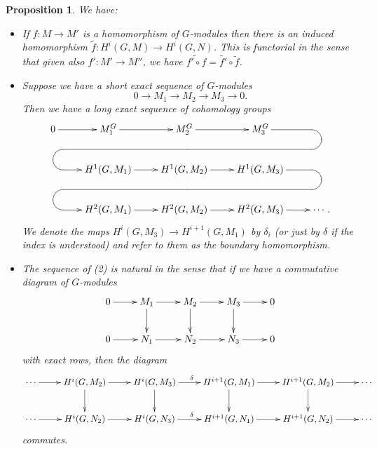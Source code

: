 \documentclass[11pt]{amsart}
\numberwithin{equation}{section}
\newtheorem{proposition}[equation]{Proposition}
\theoremstyle{remark}
\theoremstyle{remark}
\theoremstyle{remark}
\theoremstyle{definition}
\theoremstyle{definition}
\theoremstyle{definition}
\theoremstyle{definition}
\theoremstyle{definition}
\theoremstyle{definition}
\begin{document}
\begin{proposition} \label{long exac cohomo grps}
We have:
\begin{itemize}
\item[(1)]
If $f:M\rightarrow M'$ is a homomorphism of $G$-modules then there is an induced homomorphism $\tilde{f}:H^i(G,M)\rightarrow H^i(G,N)$. This is functorial in the sense that given also $f':M'\rightarrow M''$, we have $\widetilde{f'\circ f}=\widetilde{f'}\circ \tilde{f}$.  
\item[(2)] 
Suppose we have a short exact sequence of $G$-modules \[0\rightarrow M_1 \longrightarrow M_2 \longrightarrow M_3 \rightarrow 0.\] 
Then we have a long exact sequence of cohomology groups
\[\xymatrix{
0\ar[r]^>>>>>{}& M_1^G\ar[r]^>>>>>{} 
& M_2^G\ar[r]^>>>>>{} 
&M_3^G\ar `[dr] `[r] `[llld]|{}  `[rd][lrdlllr]  &\\
& H^1(G,M_1)  \ar[r]^>>>>>{} & H^1(G,M_2) \ar[r]^>>>>>{} 
&H^1(G,M_3)\ar `[dr] `[r] `[llld]|{}  `[rd][lrdlllr] &\\
&H^2(G,M_1) \ar[r]^>>>>>{} & H^2(G,M_2)\ar[r]^>>>>>{} 
& H^2(G,M_3)\ar[r]&\cdots.}\] 
We denote the maps $H^i(G,M_3)\rightarrow H^{i+1}(G,M_1)$ by $\delta_i$ (or just by $\delta$ if the index is understood) and refer to them as the \emph{boundary homomorphism}.

\item[(3)] The sequence of (2) is natural in the sense that if we have a commutative diagram of $G$-modules
\[
\xymatrix{0\ar[r]&M_1\ar[r]\ar[d]&M_2\ar[r]\ar[d]& M_3\ar[r]\ar[d]&0\\0\ar[r]&N_1\ar[r]&
N_2\ar[r] &N_3\ar[r]&0
}
\] 
with exact rows, then the diagram
\[
\xymatrix{\cdots\ar[r]&H^i(G,M_2)\ar[r]\ar[d]&H^i(G,M_3)\ar[r]^\delta\ar[d]& H^{i+1}(G,M_1)\ar[r]\ar[d]&H^{i+1}(G,M_2)\ar[d]\ar[r]&\cdots \\ \cdots\ar[r]&H^i(G,N_2)\ar[r]&
H^i(G,N_3)\ar[r]^\delta &H^{i+1}(G,N_1)\ar[r]&H^{i+1}(G,N_2)\ar[r]&
\cdots}
\] 
commutes. 
\end{itemize}
\end{proposition}
\end{document}
